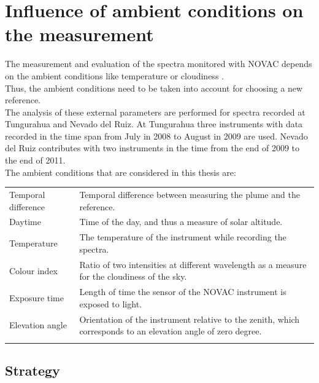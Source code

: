 \section{Influence of ambient conditions on the measurement \label{Chap:BROErr}}
The measurement and evaluation of the spectra monitored with NOVAC depends on the ambient conditions like temperature or cloudiness \citep{lubcke2014optical}.\\
Thus, the ambient conditions need to be taken into account for choosing a new reference.\\
The analysis of these external parameters are performed for spectra recorded at Tungurahua and Nevado del Ruiz. At Tungurahua three instruments with data recorded in the time span from July in 2008 to August in 2009 are used. Nevado del Ruiz contributes with two instruments in the time from the end of 2009 to the end of 2011.\\
%
The ambient conditions that are considered in this thesis are:
\begin{table}[h!]
	\centering
	\begin{tabular}{p{4cm}p{8.5cm}}
		Temporal difference &Temporal difference between measuring the plume and the reference.\\
		Daytime & Time of the day, and thus a measure of solar altitude.\\
		Temperature& The temperature of the instrument while recording the spectra.\\
		Colour index&Ratio of two intensities at different wavelength as a measure for the cloudiness of the sky.\\
		Exposure time& Length of time the sensor of the NOVAC instrument is exposed to light.\\
		Elevation angle& Orientation of the instrument relative to the zenith, which corresponds to an elevation angle of zero degree.\\
		\label{tab:externalparametters}
	\end{tabular}
\end{table}	
%



\subsection{Strategy}

